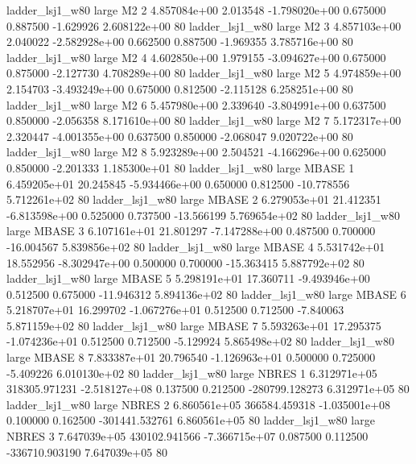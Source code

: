     ladder_lsj1_w80      large       M2                 2 4.857084e+00      2.013548 -1.798020e+00 0.675000 0.887500      -1.629926 2.608122e+00 80
    ladder_lsj1_w80      large       M2                 3 4.857103e+00      2.040022 -2.582928e+00 0.662500 0.887500      -1.969355 3.785716e+00 80
    ladder_lsj1_w80      large       M2                 4 4.602850e+00      1.979155 -3.094627e+00 0.675000 0.875000      -2.127730 4.708289e+00 80
    ladder_lsj1_w80      large       M2                 5 4.974859e+00      2.154703 -3.493249e+00 0.675000 0.812500      -2.115128 6.258251e+00 80
    ladder_lsj1_w80      large       M2                 6 5.457980e+00      2.339640 -3.804991e+00 0.637500 0.850000      -2.056358 8.171610e+00 80
    ladder_lsj1_w80      large       M2                 7 5.172317e+00      2.320447 -4.001355e+00 0.637500 0.850000      -2.068047 9.020722e+00 80
    ladder_lsj1_w80      large       M2                 8 5.923289e+00      2.504521 -4.166296e+00 0.625000 0.850000      -2.201333 1.185300e+01 80
    ladder_lsj1_w80      large    MBASE                 1 6.459205e+01     20.245845 -5.934466e+00 0.650000 0.812500     -10.778556 5.712261e+02 80
    ladder_lsj1_w80      large    MBASE                 2 6.279053e+01     21.412351 -6.813598e+00 0.525000 0.737500     -13.566199 5.769654e+02 80
    ladder_lsj1_w80      large    MBASE                 3 6.107161e+01     21.801297 -7.147288e+00 0.487500 0.700000     -16.004567 5.839856e+02 80
    ladder_lsj1_w80      large    MBASE                 4 5.531742e+01     18.552956 -8.302947e+00 0.500000 0.700000     -15.363415 5.887792e+02 80
    ladder_lsj1_w80      large    MBASE                 5 5.298191e+01     17.360711 -9.493946e+00 0.512500 0.675000     -11.946312 5.894136e+02 80
    ladder_lsj1_w80      large    MBASE                 6 5.218707e+01     16.299702 -1.067276e+01 0.512500 0.712500      -7.840063 5.871159e+02 80
    ladder_lsj1_w80      large    MBASE                 7 5.593263e+01     17.295375 -1.074236e+01 0.512500 0.712500      -5.129924 5.865498e+02 80
    ladder_lsj1_w80      large    MBASE                 8 7.833387e+01     20.796540 -1.126963e+01 0.500000 0.725000      -5.409226 6.010130e+02 80
    ladder_lsj1_w80      large    NBRES                 1 6.312971e+05 318305.971231 -2.518127e+08 0.137500 0.212500 -280799.128273 6.312971e+05 80
    ladder_lsj1_w80      large    NBRES                 2 6.860561e+05 366584.459318 -1.035001e+08 0.100000 0.162500 -301441.532761 6.860561e+05 80
    ladder_lsj1_w80      large    NBRES                 3 7.647039e+05 430102.941566 -7.366715e+07 0.087500 0.112500 -336710.903190 7.647039e+05 80

